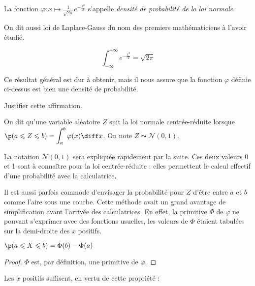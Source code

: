 \documentclass[12pt,a4paper,french]{article}
\begin{document}
\begin{definition}
  La fonction $\varphi : x\mapsto \frac1{\sqrt{2\pi}}e^{-\frac{x^2}2}$
  s'appelle \emph{densité de probabilité de la loi normale}.
\end{definition}

On dit aussi loi de Laplace-Gauss du nom des premiers mathématiciens à
l'avoir étudié.

\begin{proposition}[admise]
  \[ \displaystyle\int_{-\infty}^{+\infty} e^{-\frac{x^2}2} = \sqrt{2\pi} \]
\end{proposition}

Ce résultat général est dur à obtenir, mais il nous assure que la
fonction $\varphi$ définie ci-dessus est bien une densité de
probabilité.

\begin{question}
  Justifier cette affirmation.
\end{question}

\begin{definition}
  On dit qu'une variable aléatoire $Z$ suit la loi normale
  centrée-réduite lorsque $\p(a\leqslant Z \leqslant b) =
  \displaystyle\int_a^b \varphi(x)\diff x$. On note $Z \leadsto
  \mathcal{N}(0,1)$.
\end{definition}

\begin{remarque} La notation $\mathcal{N}(0,1)$ sera expliquée
  rapidement par la suite. Ces deux valeurs 0 et 1 sont à connaître pour
  la loi centrée-réduite : elles permettent le calcul effectif d'une
  probabilité avec la calculatrice.
\end{remarque}

Il est aussi parfois commode d'envisager la probabilité pour $Z$ d'être
entre $a$ et $b$ comme l'aire sous une courbe. Cette méthode avait un
grand avantage de simplification avant l'arrivée des calculatrices. En
effet, la primitive $\Phi$ de $\varphi$ ne pouvant s'exprimer avec des
fonctions usuelles, les valeurs de $\Phi$ étaient tabulées sur la
demi-droite des $x$ positifs.

\begin{proposition}
  $\p(a \leqslant X \leqslant b) = \Phi(b) - \Phi(a)$
\end{proposition}
\begin{proof}
  $\Phi$ est, par définition, une primitive de $\varphi$.
\end{proof}

Les $x$ positifs suffisent, en vertu de cette propriété :
\end{document}
